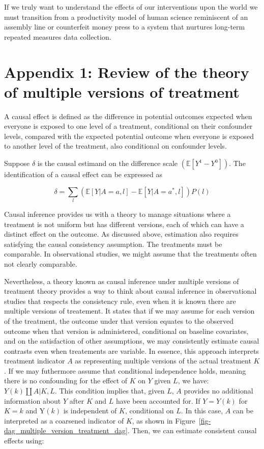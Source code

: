 \documentclass[
  singlecolumn]{report}
\begin{document}
If we truly want to understand the effects of our interventions upon the
world we must transition from a productivity model of human science
reminiscent of an assembly line or counterfeit money press to a system
that nurtures long-term repeated measures data collection.

\newpage{}

\hypertarget{appendix-1-review-of-the-theory-of-multiple-versions-of-treatment}{%
\section{Appendix 1: Review of the theory of multiple versions of
treatment}\label{appendix-1-review-of-the-theory-of-multiple-versions-of-treatment}}

A causal effect is defined as the difference in potential outcomes
expected when everyone is exposed to one level of a treatment,
conditional on their confounder levels, compared with the expected
potential outcome when everyone is exposed to another level of the
treatment, also conditional on confounder levels.

Suppose \(\delta\) is the causal estimand on the difference scale
\((\mathbb{E}[Y^1 - Y^0])\). The identification of a causal effect can
be expressed as

\[ \delta = \sum_l \left( \mathbb{E}[Y|A=a,l] - \mathbb{E}[Y|A=a^*,l] \right) P(l)\]

Causal inference provides us with a theory to manage situations where a
treatment is not uniform but has different versions, each of which can
have a distinct effect on the outcome. As discussed above, estimation
also requires satisfying the causal consistency assumption. The
treatments must be comparable. In observational studies, we might assume
that the treatments often not clearly comparable.

Nevertheless, a theory known as causal inference under multiple versions
of treatment theory provides a way to think about causal inference in
observational studies that respects the consistency rule, even when it
is known there are multiple versions of treatement. It states that if we
may assume for each version of the treatment, the outcome under that
version equates to the observed outcome when that version is
administered, conditional on baseline covariates, and on the
satisfaction of other assumptions, we may consistently estimate causal
contrasts even when treatements are variable. In essence, this approach
interprets treatment indicator \(A\) as representing multiple versions
of the actual treatment \(K\). If we may futhermore assume that
conditional independence holds, meaning there is no confounding for the
effect of \(K\) on \(Y\) given \(L\), we have: \(Y(k)\coprod A|K,L\).
This condition implies that, given \(L\), \(A\) provides no additional
information about \(Y\) after \(K\) and \(L\) have been accounted for.
If \(Y = Y(k)\) for \(K = k\) and Y\((k)\) is independent of \(K\),
conditional on \(L\). In this case, \(A\) can be interpreted as a
coarsened indicator of \(K\), as shown in
Figure~\ref{fig-dag_multiple_version_treatment_dag}. Then, we can
estimate consistent causal effects using:
\end{document}
